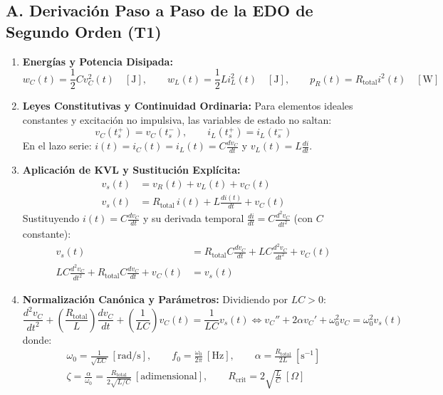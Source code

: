 \documentclass[11pt, a4paper]{article}
\begin{document}
\subsection*{A. Derivación Paso a Paso de la EDO de Segundo Orden (T1)}
\begin{enumerate}\setlength\itemsep{0.15cm}
    \item \textbf{Energías y Potencia Disipada:}
    $$w_C(t) = \frac{1}{2} C v_C^2(t)\quad [\text{J}], \qquad w_L(t) = \frac{1}{2} L i_L^2(t)\quad [\text{J}], \qquad p_R(t) = R_{\text{total}} i^2(t)\quad [\text{W}]$$
    \item \textbf{Leyes Constitutivas y Continuidad Ordinaria:}
    Para elementos ideales constantes y excitación no impulsiva, las variables de estado no saltan:
    $$v_C(t_s^+) = v_C(t_s^-), \qquad i_L(t_s^+) = i_L(t_s^-)$$
    En el lazo serie: $i(t) = i_C(t) = i_L(t) = C\frac{dv_C}{dt}$ y $v_L(t) = L\frac{di}{dt}$.
    \item \textbf{Aplicación de KVL y Sustitución Explícita:}
    \begin{align*}
        v_s(t) &= v_R(t) + v_L(t) + v_C(t) \\
        v_s(t) &= R_{\text{total}}\,i(t) + L\frac{di(t)}{dt} + v_C(t)
    \end{align*}
    Sustituyendo $i(t) = C\frac{dv_C}{dt}$ y su derivada temporal $\frac{di}{dt} = C\frac{d^2v_C}{dt^2}$ (con $C$ constante):
    \begin{align*}
        v_s(t) &= R_{\text{total}} C \frac{dv_C}{dt} + L C \frac{d^2v_C}{dt^2} + v_C(t) \\
        L C \frac{d^2v_C}{dt^2} + R_{\text{total}} C \frac{dv_C}{dt} + v_C(t) &= v_s(t)
    \end{align*}
    \item \textbf{Normalización Canónica y Parámetros:} Dividiendo por $LC > 0$:
    $$\frac{d^2v_C}{dt^2} + \left(\frac{R_{\text{total}}}{L}\right)\frac{dv_C}{dt} + \left(\frac{1}{LC}\right)v_C(t) = \frac{1}{LC}v_s(t) \iff v_C'' + 2\alpha v_C' + \omega_0^2 v_C = \omega_0^2 v_s(t)$$
    donde:
    \begin{gather*}
        \omega_0 = \frac{1}{\sqrt{LC}}\ [\text{rad/s}], \qquad f_0 = \frac{\omega_0}{2\pi}\ [\text{Hz}], \qquad \alpha = \frac{R_{\text{total}}}{2L}\ [\text{s}^{-1}] \\
        \zeta = \frac{\alpha}{\omega_0} = \frac{R_{\text{total}}}{2\sqrt{L/C}}\ [\text{adimensional}], \qquad R_{\text{crit}} = 2\sqrt{\frac{L}{C}}\ [\Omega]
    \end{gather*}
\end{enumerate}
\end{document}
